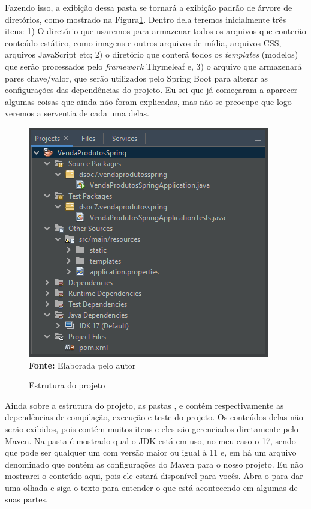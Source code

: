 Fazendo isso, a exibição dessa pasta se tornará a exibição padrão de árvore de diretórios, como mostrado na Figura\ref{fig:cap10EstruturaProjetoOK}. Dentro dela teremos inicialmente três itens: 1) O diretório  que usaremos para armazenar todos os arquivos que conterão conteúdo estático, como imagens e outros arquivos de mídia, arquivos CSS, arquivos JavaScript etc; 2) o diretório  que conterá todos os \textit{templates} (modelos) que serão processados pelo \textit{framework} Thymeleaf e, 3) o arquivo  que armazenará pares chave/valor, que serão utilizados pelo Spring Boot para alterar as configurações das dependências do projeto. Eu sei que já começaram a aparecer algumas coisas que ainda não foram explicadas, mas não se preocupe que logo veremos a serventia de cada uma delas.

\FloatBarrier
\begin{figure}[!htbp]
    \centering
    \caption{Estrutura do projeto}
    \includegraphics[scale=1]{imagens/cap10EstruturaProjetoOK}
    \\\textbf{Fonte:} Elaborada pelo autor
    \label{fig:cap10EstruturaProjetoOK}
\end{figure}
\FloatBarrier

Ainda sobre a estrutura do projeto, as pastas ,  e  contém respectivamente as dependências de compilação, execução e teste do projeto. Os conteúdos delas não serão exibidos, pois contém muitos itens e eles são gerenciados diretamente pelo Maven. Na pasta  é mostrado qual o JDK está em uso, no meu caso o 17, sendo que pode ser qualquer um com versão maior ou igual à 11 e, em  há um arquivo denominado  que contém as configurações do Maven para o nosso projeto. Eu não mostrarei o conteúdo aqui, pois ele estará disponível para vocês. Abra-o para dar uma olhada e siga o texto para entender o que está acontecendo em algumas de suas partes.

